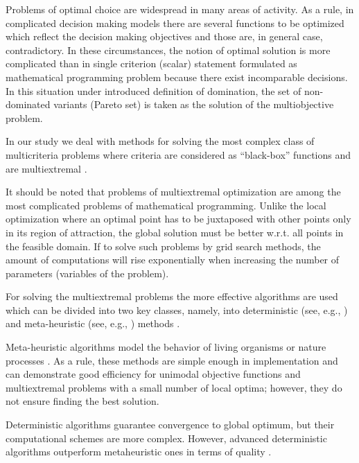 \documentclass[runningheads]{llncs}
\begin{document}
\cite{Miettinen1999,Ehrgott2005,Pardalos2017,ML_MCO_2023,Evtushenko2014,Deb2002,Durillo2010,Mostaghim2007,NDG09,RC05,ZLT01,Gergel2019_2,Gergel2018,GergelKozinov2020,Marler2004,Strongin2000,Sergeyev2013,SVM_2000,PROB_2004,iOpt_url,Grishagin2015_2}

Problems of optimal choice are widespread in many areas of activity. As a rule, in complicated decision making models there are several functions to be optimized which reflect the decision making objectives and those are, in general case, contradictory. In these circumstances, the notion of optimal solution is more complicated than in single criterion (scalar) statement formulated as mathematical programming problem because there exist incomparable decisions. In this situation under introduced definition of domination, the set of non-dominated variants (Pareto set) is taken as the solution of the multiobjective problem.

In our study we deal with methods for solving the most complex class of multicriteria problems where criteria are considered as ``black-box'' functions and are multiextremal \cite{Miettinen1999,Ehrgott2005,Pardalos2017,Strongin2000,Sergeyev2013}.

It should be noted that problems of multiextremal optimization are among the most complicated problems of mathematical programming. Unlike the local optimization where an optimal point has to be juxtaposed with other points only in its region of attraction, the global solution must be better w.r.t. all points in the feasible domain. If to solve such problems by grid search methods, the amount of computations will rise exponentially when increasing the number of parameters (variables of the problem).

For solving the multiextremal problems the more effective algorithms are used which can be divided into two key classes, namely, into deterministic (see, e.g., \cite{Evtushenko2014,Gergel2018,GergelKozinov2020,Paulavicius2020,Jones2021}) and meta-heuristic (see, e.g., \cite{Battiti2009,Gendreau2010,Eiben2015}) methods . 

Meta-heuristic algorithms model the behavior of living organisms or nature processes \cite{Deb2002,Durillo2010,Mostaghim2007,NDG09,RC05,ZLT01}. As a rule, these methods are simple enough in implementation and can demonstrate good efficiency for unimodal objective functions and multiextremal problems with a small number of local optima; however, they do not ensure finding the best solution.

Deterministic algorithms guarantee convergence to global optimum, but their computational schemes are more complex. However, advanced deterministic algorithms outperform metaheuristic ones in terms of quality \cite{Kvasov2018,Sergeyev2018}.
\end{document}
